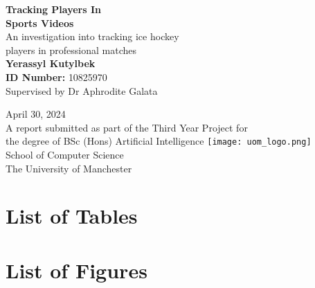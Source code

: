 \documentclass[12pt, letterpaper]{article}
\begin{document}
\begin{center}
    \Huge\textbf{Tracking Players In \\ Sports Videos} \\[12pt]
    \Large{An investigation into tracking ice hockey \\ players in professional matches} \\[55pt]
    \huge\textbf{Yerassyl Kutylbek} \\[6pt]
    \Large\textbf{ID Number:} {10825970} \\[5pt]
    \Large{Supervised by Dr Aphrodite Galata} \\[5pt]
    \date\Large{April 30, 2024} \\[90pt]

    \large{A report submitted as part of the Third Year Project for} \\[3pt]
    \large{the degree of BSc (Hons) Artificial Intelligence}
    \centering
    \texttt{[image: uom\_logo.png]} \\
    \large{School of Computer Science} \\[5pt]
    \large{The University of Manchester}
\end{center}

\tableofcontents
\newpage

\section*{\Huge List of Tables}
\newpage

\section*{\Huge List of Figures}

\newpage

\end{document}
